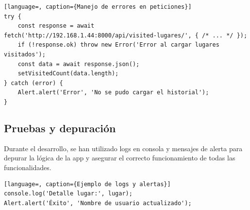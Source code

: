 \begin{lstlisting}[language=, caption={Manejo de errores en peticiones}]
try {
    const response = await fetch('http://192.168.1.44:8000/api/visited-lugares/', { /* ... */ });
    if (!response.ok) throw new Error('Error al cargar lugares visitados');
    const data = await response.json();
    setVisitedCount(data.length);
} catch (error) {
    Alert.alert('Error', 'No se pudo cargar el historial');
}
\end{lstlisting}

\subsection{Pruebas y depuración}

Durante el desarrollo, se han utilizado logs en consola y mensajes de alerta para depurar la lógica de la app y asegurar el correcto funcionamiento de todas las funcionalidades.

\begin{lstlisting}[language=, caption={Ejemplo de logs y alertas}]
console.log('Detalle lugar:', lugar);
Alert.alert('Éxito', 'Nombre de usuario actualizado');
\end{lstlisting}
